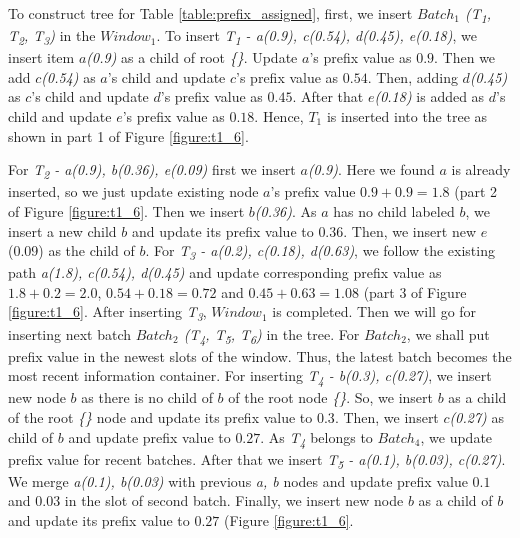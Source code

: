 \documentclass[conference]{IEEEtran}
\begin{document}
To construct tree for Table \ref{table:prefix_assigned}, first, we insert \emph{$Batch_{1}$ (T\textsubscript{1}, T\textsubscript{2}, T\textsubscript{3})} in the $Window_{1}$. To insert \emph{T\textsubscript{1} - a(0.9), c(0.54), d(0.45), e(0.18)}, we insert item \emph{$a$(0.9)} as a child of root \emph{\{\}}. Update $a$'s prefix value as $0.9$. Then we add \emph{$c$(0.54)} as $a$'s child and update $c$'s prefix value as $0.54$. Then, adding \emph{$d$(0.45)} as $c$'s child and update $d$'s prefix value as $0.45$. After that \emph{$e$(0.18)} is added as $d$'s child and update $e$'s prefix value as $0.18$. Hence, \emph{$T_{1}$} is inserted into the tree as shown in part 1 of Figure \ref{figure:t1_6}.

For \emph{T\textsubscript{2} - a(0.9), b(0.36), e(0.09)} first we insert \emph{$a$(0.9)}. Here we found \emph{$a$} is already inserted, so we just update existing node $a$'s prefix value $0.9 + 0.9 = 1.8$ (part 2 of Figure \ref{figure:t1_6}. Then we insert \emph{$b$(0.36)}. As \emph{$a$} has no child labeled \emph{$b$}, we insert a new child $b$ and update its prefix value to $0.36$. Then, we insert new $e$(0.09) as the child of \emph{$b$}. For \emph{T\textsubscript{3} - a(0.2), c(0.18), d(0.63)}, we follow the existing path \emph{a(1.8), c(0.54), d(0.45)} and update corresponding prefix value as $1.8 + 0.2 = 2.0$, $0.54 + 0.18 = 0.72$ and $0.45 + 0.63 = 1.08$ (part 3 of Figure \ref{figure:t1_6}. After inserting \emph{T\textsubscript{3}}, $Window_{1}$ is completed. Then we will go for inserting next batch \emph{$Batch_2$ (T\textsubscript{4}, T\textsubscript{5}, T\textsubscript{6})} in the tree. For \emph{$Batch_{2}$}, we shall put prefix value in the newest slots of the window. Thus, the latest batch becomes the most recent information container. For inserting \emph{T\textsubscript{4} - b(0.3), c(0.27)}, we insert new node \emph{$b$} as there is no child of $b$ of the root node \emph{\{\}}. So, we insert \emph{$b$} as a child of the root \emph{\{\}} node and update its prefix value to $0.3$. Then, we insert \emph{$c$(0.27)} as child of \emph{$b$} and update prefix value to $0.27$. As \emph{T\textsubscript{4}} belongs to \emph{$Batch_{4}$}, we update prefix value for recent batches. After that we insert \emph{T\textsubscript{5} - a(0.1), b(0.03), c(0.27)}. We merge \emph{a(0.1), b(0.03)} with previous \emph{a, b } nodes and update prefix value $0.1$ and $0.03$ in the slot of second batch. Finally, we insert new node \emph{$b$} as a child of \emph{$b$} and update its prefix value to $0.27$ (Figure \ref{figure:t1_6}.
    
\end{document}
